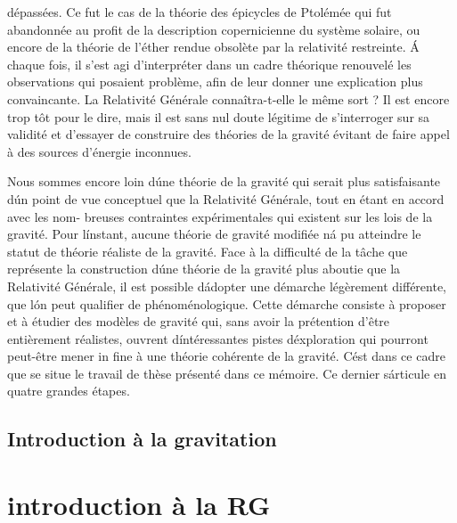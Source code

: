 \documentclass[a4paper,12pt]{report}
\theoremstyle{plain}
\theoremstyle{plain}
\begin{document}
d\'epass\'ees. Ce fut le cas de la th\'eorie des \'epicycles de Ptol\'em\'ee qui fut abandonn\'ee au
profit de la description copernicienne du syst\`eme solaire, ou encore de la th\'eorie de l'\'ether
rendue obsol\`ete par la relativit\'e restreinte. \'A chaque fois, il s'est agi d'interpr\'eter dans
un cadre th\'eorique renouvel\'e les observations qui posaient probl\`eme, afin de leur donner
une explication plus convaincante. La Relativit\'e G\'en\'erale conna\^itra-t-elle le m\^eme sort ?
Il est encore trop t\^ot pour le dire, mais il est sans nul doute l\'egitime de s'interroger sur
sa validit\'e et d'essayer de construire des th\'eories de la gravit\'e \'evitant de faire appel \`a des
sources d'\'energie inconnues. 

Nous sommes encore loin d\'une th\'eorie de la gravit\'e qui serait plus satisfaisante d\'un
point de vue conceptuel que la Relativit\'e G\'en\'erale, tout en \'etant en accord avec les nom-
breuses contraintes exp\'erimentales qui existent sur les lois de la gravit\'e. Pour l\'instant,
aucune th\'eorie de gravit\'e modifi\'ee n\'a pu atteindre le statut de th\'eorie r\'ealiste de la gravit\'e. Face \`a la difficult\'e de la t\^ache que repr\'esente la construction d\'une th\'eorie de la gravit\'e
plus aboutie que la Relativit\'e G\'en\'erale, il est possible d\'adopter une d\'emarche l\'eg\`erement
diff\'erente, que l\'on peut qualifier de ph\'enom\'enologique. Cette d\'emarche consiste \`a proposer
et \`a \'etudier des mod\`eles de gravit\'e qui, sans avoir la pr\'etention d'\^etre enti\`erement r\'ealistes, ouvrent d\'int\'eressantes pistes d\'exploration qui pourront peut-\^etre mener in fine \`a
une th\'eorie coh\'erente de la gravit\'e.
C\'est dans ce cadre que se situe le travail de th\`ese pr\'esent\'e dans ce m\'emoire. Ce dernier
s\'articule en quatre grandes \'etapes.
 
 
\chapter{Introduction \`a la gravitation }\label{chapitre1}
\part{introduction \`a la RG}
\minitoc 
\end{document}
